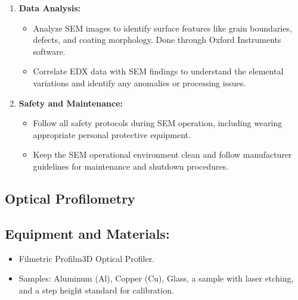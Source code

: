 \documentclass[11pt]{article}
\begin{document}
\begin{enumerate}
			\item \textbf{Data Analysis:}
			\begin{itemize}
				\item Analyze SEM images to identify surface features like grain boundaries, defects, and coating morphology. Done through Oxford Instruments software.
				\item Correlate EDX data with SEM findings to understand the elemental variations and identify any anomalies or processing issues.
			\end{itemize}
			
			\item \textbf{Safety and Maintenance:}
			\begin{itemize}
				\item Follow all safety protocols during SEM operation, including wearing appropriate personal protective equipment.
				\item Keep the SEM operational environment clean and follow manufacturer guidelines for maintenance and shutdown procedures.
			\end{itemize}
		\end{enumerate}
	
	
\clearpage
	
	\subsection{Optical Profilometry}
	
		\subsection*{Equipment and Materials:}
		\begin{itemize}
			\item Filmetric Profilm3D Optical Profiler.
			\item Samples: Aluminum (Al), Copper (Cu), Glass, a sample with laser etching, and a step height standard for calibration.
		\end{itemize}
		
\end{document}
